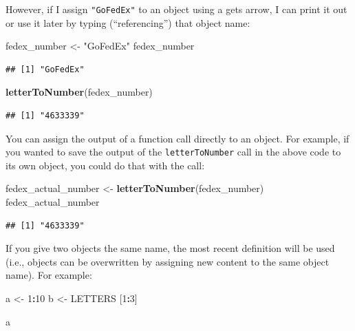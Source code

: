 \documentclass[]{book}
\makeatletter
\newenvironment{Shaded}{\begin{snugshade}}{\end{snugshade}}
\newcommand{\KeywordTok}[1]{\textcolor[rgb]{0.13,0.29,0.53}{\textbf{#1}}}
\newcommand{\DecValTok}[1]{\textcolor[rgb]{0.00,0.00,0.81}{#1}}
\newcommand{\StringTok}[1]{\textcolor[rgb]{0.31,0.60,0.02}{#1}}
\newcommand{\OperatorTok}[1]{\textcolor[rgb]{0.81,0.36,0.00}{\textbf{#1}}}
\newcommand{\NormalTok}[1]{#1}
\newenvironment{kframe}{%
\medskip{}
\setlength{\fboxsep}{.8em}
 \def\at@end@of@kframe{}%
 \ifinner\ifhmode%
  \def\at@end@of@kframe{\end{minipage}}%
  \begin{minipage}{\columnwidth}%
 \fi\fi%
 \def\FrameCommand##1{\hskip\@totalleftmargin \hskip-\fboxsep
 \colorbox{shadecolor}{##1}\hskip-\fboxsep
     \hskip-\linewidth \hskip-\@totalleftmargin \hskip\columnwidth}%
 \MakeFramed {\advance\hsize-\width
   \@totalleftmargin\z@ \linewidth\hsize
   \@setminipage}}%
 {\par\unskip\endMakeFramed%
 \at@end@of@kframe}
\renewenvironment{Shaded}{\begin{kframe}}{\end{kframe}}
\theoremstyle{definition}
\theoremstyle{definition}
\theoremstyle{definition}
\theoremstyle{remark}
\makeatother
\begin{document}
However, if I assign \texttt{"GoFedEx"} to an object using a gets arrow,
I can print it out or use it later by typing (``referencing'') that
object name:

\begin{Shaded}
\begin{Highlighting}[]
\NormalTok{fedex_number <-}\StringTok{ "GoFedEx"}
\NormalTok{fedex_number}
\end{Highlighting}
\end{Shaded}

\begin{verbatim}
## [1] "GoFedEx"
\end{verbatim}

\begin{Shaded}
\begin{Highlighting}[]
\KeywordTok{letterToNumber}\NormalTok{(fedex_number)}
\end{Highlighting}
\end{Shaded}

\begin{verbatim}
## [1] "4633339"
\end{verbatim}

You can assign the output of a function call directly to an object. For
example, if you wanted to save the output of the \texttt{letterToNumber}
call in the above code to its own object, you could do that with the
call:

\begin{Shaded}
\begin{Highlighting}[]
\NormalTok{fedex_actual_number <-}\StringTok{ }\KeywordTok{letterToNumber}\NormalTok{(fedex_number)}
\NormalTok{fedex_actual_number}
\end{Highlighting}
\end{Shaded}

\begin{verbatim}
## [1] "4633339"
\end{verbatim}

If you give two objects the same name, the most recent definition will
be used (i.e., objects can be overwritten by assigning new content to
the same object name). For example:

\begin{Shaded}
\begin{Highlighting}[]
\NormalTok{a <-}\StringTok{ }\DecValTok{1}\OperatorTok{:}\DecValTok{10}
\NormalTok{b <-}\StringTok{ }\NormalTok{LETTERS [}\DecValTok{1}\OperatorTok{:}\DecValTok{3}\NormalTok{]}

\NormalTok{a}
\end{Highlighting}
\end{Shaded}
\end{document}
